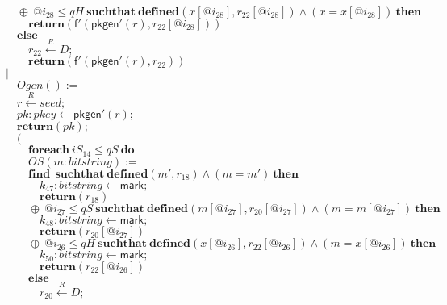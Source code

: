 \documentclass{article}
\newcommand{\store}{\leftarrow}
\newcommand{\getR}{\stackrel{R}{\store}}
\newcommand{\kw}[1]{\mathbf{#1}}
\newcommand{\kwf}[1]{\mathsf{#1}}
\newcommand{\var}[1]{\mathit{#1}}
\newcommand{\kwt}[1]{\mathit{#1}}
\newcommand{\kwp}[1]{\mathit{#1}}
\begin{document}
\begin{tabbing}
$\quad \oplus\ \var{@i}_{28} \leq \kwp{qH}\ \kw{suchthat}\ \kw{defined}(\var{x}[\var{@i}_{28}], \var{r}_{22}[\var{@i}_{28}])\wedge (\var{x}  =  \var{x}[\var{@i}_{28}])\ \kw{then}$\\
$\quad \quad \kw{return}\kwf{}(\kwf{f'}(\kwf{pkgen'}(\var{r}), \var{r}_{22}[\var{@i}_{28}]))$\\
$\quad \kw{else}$\\
$\quad \quad \var{r}_{22} \getR \kwt{D};$\\
$\quad \quad \kw{return}\kwf{}(\kwf{f'}(\kwf{pkgen'}(\var{r}), \var{r}_{22}))$\\
$|$\\
$\quad Ogen() :=$\\
$\quad \var{r} \getR \kwt{seed};$\\
$\quad \var{pk}: \kwt{pkey} \store \kwf{pkgen'}(\var{r});$\\
$\quad \kw{return}\kwf{}(\var{pk});$\\
$\quad ($\\
$\quad \quad \kw{foreach}\ \var{iS}_{14} \leq \kwp{qS}\ \kw{do}$\\
$\quad \quad OS(\var{m}: \kwt{bitstring}) :=$\\
$\quad \quad \kw{find}\ \ \kw{suchthat}\ \kw{defined}(\var{m'}, \var{r}_{18})\wedge (\var{m}  =  \var{m'})\ \kw{then}$\\
$\quad \quad \quad \var{k}_{47}: \kwt{bitstring} \store \kwf{mark};$\\
$\quad \quad \quad \kw{return}\kwf{}(\var{r}_{18})$\\
$\quad \quad \oplus\ \var{@i}_{27} \leq \kwp{qS}\ \kw{suchthat}\ \kw{defined}(\var{m}[\var{@i}_{27}], \var{r}_{20}[\var{@i}_{27}])\wedge (\var{m}  =  \var{m}[\var{@i}_{27}])\ \kw{then}$\\
$\quad \quad \quad \var{k}_{48}: \kwt{bitstring} \store \kwf{mark};$\\
$\quad \quad \quad \kw{return}\kwf{}(\var{r}_{20}[\var{@i}_{27}])$\\
$\quad \quad \oplus\ \var{@i}_{26} \leq \kwp{qH}\ \kw{suchthat}\ \kw{defined}(\var{x}[\var{@i}_{26}], \var{r}_{22}[\var{@i}_{26}])\wedge (\var{m}  =  \var{x}[\var{@i}_{26}])\ \kw{then}$\\
$\quad \quad \quad \var{k}_{50}: \kwt{bitstring} \store \kwf{mark};$\\
$\quad \quad \quad \kw{return}\kwf{}(\var{r}_{22}[\var{@i}_{26}])$\\
$\quad \quad \kw{else}$\\
$\quad \quad \quad \var{r}_{20} \getR \kwt{D};$\\

\end{tabbing}
\end{document}
